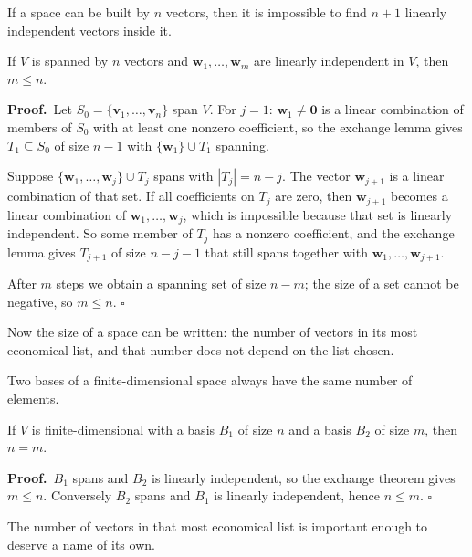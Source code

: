 If a space can be built by $n$ vectors, then it is impossible to find $n+1$ linearly independent
vectors inside it.

\begin{teorema}[Exchange]
If $V$ is spanned by $n$ vectors and $\mathbf{w}_{1},\dots,\mathbf{w}_{m}$ are linearly
independent in $V$, then $m\le n$.
\end{teorema}

\par\medskip\noindent\textbf{Proof.}\ 
Let $S_{0}=\{\mathbf{v}_{1},\dots,\mathbf{v}_{n}\}$ span $V$. For $j=1$:
$\mathbf{w}_{1}\neq\mathbf{0}$ is a linear combination of members of $S_{0}$ with at least one
nonzero coefficient, so the exchange lemma gives $T_{1}\subseteq S_{0}$ of size $n-1$ with
$\{\mathbf{w}_{1}\}\cup T_{1}$ spanning.

Suppose $\{\mathbf{w}_{1},\dots,\mathbf{w}_{j}\}\cup T_{j}$ spans with $|T_{j}|=n-j$. The vector
$\mathbf{w}_{j+1}$ is a linear combination of that set. If all coefficients on $T_{j}$ are zero,
then $\mathbf{w}_{j+1}$ becomes a linear combination of $\mathbf{w}_{1},\dots,\mathbf{w}_{j}$,
which is impossible because that set is linearly independent. So some member of $T_{j}$ has a
nonzero coefficient, and the exchange lemma gives $T_{j+1}$ of size $n-j-1$ that still spans
together with $\mathbf{w}_{1},\dots,\mathbf{w}_{j+1}$.

After $m$ steps we obtain a spanning set of size $n-m$; the size of a set cannot be negative, so
$m\le n$.
\hfill$\square$\par\medskip

Now the size of a space can be written: the number of vectors in its most economical list, and
that number does not depend on the list chosen.

Two bases of a finite-dimensional space always have the same number of elements.

\begin{akibat}
If $V$ is finite-dimensional with a basis $B_{1}$ of size $n$ and a basis $B_{2}$ of size $m$,
then $n=m$.
\end{akibat}

\par\medskip\noindent\textbf{Proof.}\ 
$B_{1}$ spans and $B_{2}$ is linearly independent, so the exchange theorem gives $m\le n$.
Conversely $B_{2}$ spans and $B_{1}$ is linearly independent, hence $n\le m$.
\hfill$\square$\par\medskip

The number of vectors in that most economical list is important enough to deserve a name of its
own.

